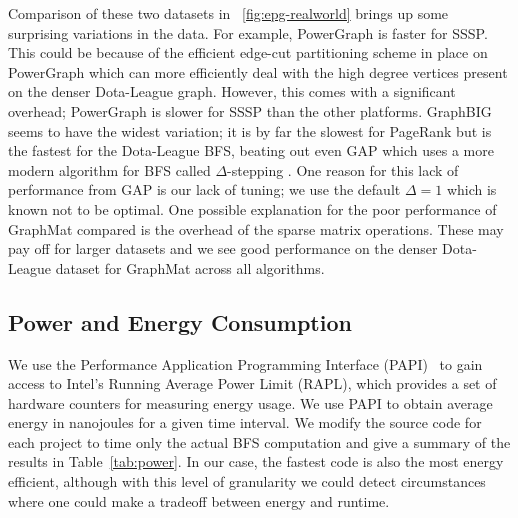 \documentclass[conference]{IEEEtran}
\begin{document}
Comparison of these two datasets in \figurename~\ref{fig:epg-realworld} brings up some surprising variations in the data. For example, PowerGraph is faster for SSSP. This could be because of the efficient edge-cut partitioning scheme in place on PowerGraph which can more efficiently deal with the high degree vertices present on the denser Dota-League graph. However, this comes with a significant overhead; PowerGraph is slower for SSSP than the other platforms. GraphBIG seems to have the widest variation; it is by far the slowest for PageRank but is the fastest for the Dota-League BFS, beating out even GAP which uses a more modern algorithm for BFS called $\Delta$-stepping \cite{Meyer:2003:delta}. One reason for this lack of performance from GAP is our lack of tuning; we use the default $\Delta = 1$ which is known not to be optimal. One possible explanation for the poor performance of GraphMat compared is the overhead of the sparse matrix operations. These may pay off for larger datasets and we see good performance on the denser Dota-League dataset for GraphMat across all algorithms.

\subsection{Power and Energy Consumption}
We use the Performance Application Programming Interface (PAPI)~\cite{Browne:2000:PAPI} to gain access to Intel's Running Average Power Limit (RAPL), which provides a set of hardware counters for measuring energy usage. We use PAPI to obtain average energy in nanojoules for a given time interval. We modify the source code for each project to time only the actual BFS computation and give a summary of the results in Table~\ref{tab:power}. In our case, the fastest code is also the most energy efficient, although with this level of granularity we could detect circumstances where one could make a tradeoff between energy and runtime.
\end{document}
